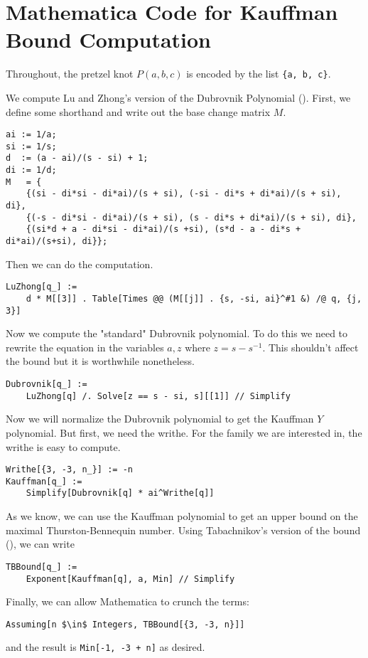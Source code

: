 \chapter{Mathematica Code for Kauffman Bound Computation}
\lstset{language=Mathematica,style=better}
Throughout, the pretzel knot $P(a, b, c)$ is encoded by the list \lstinline|{a, b, c}|.

We compute Lu and Zhong's version of the Dubrovnik Polynomial (\cite{lu-zhong}).
First, we define some shorthand and write out the base change matrix $M$.
\begin{lstlisting}
ai := 1/a;
si := 1/s;
d  := (a - ai)/(s - si) + 1;
di := 1/d;
M   = {
    {(si - di*si - di*ai)/(s + si), (-si - di*s + di*ai)/(s + si), di},
    {(-s - di*si - di*ai)/(s + si), (s - di*s + di*ai)/(s + si), di},
    {(si*d + a - di*si - di*ai)/(s +si), (s*d - a - di*s + di*ai)/(s+si), di}};
\end{lstlisting}

Then we can do the computation. 
\begin{lstlisting}
LuZhong[q_] :=
    d * M[[3]] . Table[Times @@ (M[[j]] . {s, -si, ai}^#1 &) /@ q, {j, 3}]
\end{lstlisting}

Now we compute the "standard" Dubrovnik polynomial. To do this we need to rewrite the equation in the variables $a, z$ where $z = s - s^{-1}$. This shouldn't affect the bound but it is worthwhile nonetheless.

\begin{lstlisting}
Dubrovnik[q_] :=
 	LuZhong[q] /. Solve[z == s - si, s][[1]] // Simplify
\end{lstlisting}

Now we will normalize the Dubrovnik polynomial to get the Kauffman $Y$ polynomial. But first, we need the writhe. For the family we are interested in, the writhe is easy to compute.

\begin{lstlisting}
Writhe[{3, -3, n_}] := -n
Kauffman[q_] :=
    Simplify[Dubrovnik[q] * ai^Writhe[q]]
\end{lstlisting}

As we know, we can use the Kauffman polynomial to get an upper bound on the maximal Thurston-Bennequin number. Using Tabachnikov's version of the bound (\cite{tabachnikov}), we can write

\begin{lstlisting}
TBBound[q_] :=
    Exponent[Kauffman[q], a, Min] // Simplify
\end{lstlisting}

Finally, we can allow Mathematica to crunch the terms:
\begin{lstlisting}[mathescape]
Assuming[n $\in$ Integers, TBBound[{3, -3, n}]]
\end{lstlisting}
and the result is \lstinline|Min[-1, -3 + n]| as desired.
